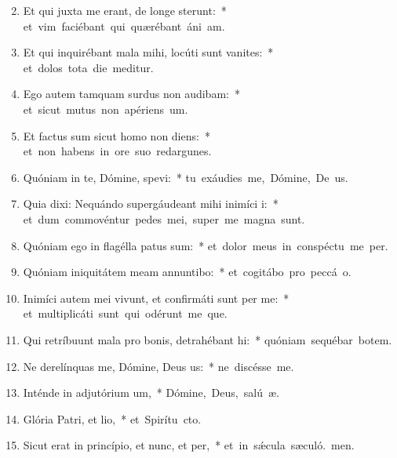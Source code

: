 \begin{flushleft}
\begin{enumerate}[leftmargin=*]
\setcounter{enumi}{1}

\item Et qui juxta me erant, de longe sterunt:~* \mbox{et vim faciébant qui quærébant áni am.}
\item Et qui inquirébant mala mihi, locúti sunt vanites:~* \mbox{et dolos tota die meditur.}
\item Ego autem tamquam surdus non audibam:~* \mbox{et sicut mutus non apériens  um.}
\item Et factus sum sicut homo non diens:~* \mbox{et non habens in ore suo redargunes.}
\item Quóniam in te, Dómine, spevi:~* \mbox{tu exáudies me, Dómine, De us.}
\item Quia dixi: Nequándo supergáudeant mihi inimíci i:~* \mbox{et dum commovéntur pedes mei, super me magna  sunt.}
\item Quóniam ego in flagélla patus sum:~* \mbox{et dolor meus in conspéctu me per.}
\item Quóniam iniquitátem meam annuntibo:~* \mbox{et cogitábo pro peccá o.}
\item Inimíci autem mei vivunt, et confirmáti sunt per me:~* \mbox{et multiplicáti sunt qui odérunt me que.}
\item Qui retríbuunt mala pro bonis, detrahébant hi:~* \mbox{quóniam sequébar botem.}
\item Ne derelínquas me, Dómine, Deus us:~* \mbox{ne discésse  me.}
\item Inténde in adjutórium um,~* \mbox{Dómine, Deus, salú æ.}
\item Glória Patri, et lio,~* \mbox{et Spirítu cto.}
\item Sicut erat in princípio, et nunc, et per,~* \mbox{et in s\'{\ae}cula sæculó. men.}

\end{enumerate}
\end{flushleft}

